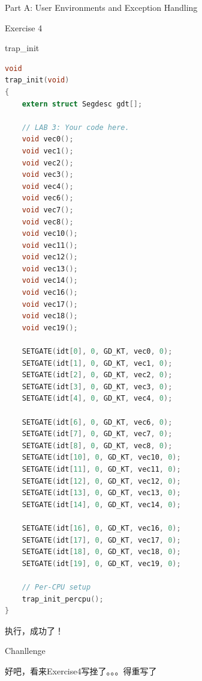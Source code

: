\documentclass[GBK,winfonts,a4paper,10pt]{ctexart}
\begin{document}
\begin{section}{ Part A: User Environments and Exception Handling }
\begin{subsection}{ Exercise 4 }
\begin{subsubsection}{ trap\_init }
\begin{lstlisting}[language=C]
void
trap_init(void)
{
	extern struct Segdesc gdt[];

	// LAB 3: Your code here.
	void vec0();
	void vec1();
	void vec2();
	void vec3();
	void vec4();
	void vec6();
	void vec7();
	void vec8();
	void vec10();
	void vec11();
	void vec12();
	void vec13();
	void vec14();
	void vec16();	
	void vec17();
	void vec18();
	void vec19();

	SETGATE(idt[0], 0, GD_KT, vec0, 0);
	SETGATE(idt[1], 0, GD_KT, vec1, 0);
	SETGATE(idt[2], 0, GD_KT, vec2, 0);
	SETGATE(idt[3], 0, GD_KT, vec3, 0);
	SETGATE(idt[4], 0, GD_KT, vec4, 0);

	SETGATE(idt[6], 0, GD_KT, vec6, 0);
	SETGATE(idt[7], 0, GD_KT, vec7, 0);
	SETGATE(idt[8], 0, GD_KT, vec8, 0);
	SETGATE(idt[10], 0, GD_KT, vec10, 0);
	SETGATE(idt[11], 0, GD_KT, vec11, 0);
	SETGATE(idt[12], 0, GD_KT, vec12, 0);
	SETGATE(idt[13], 0, GD_KT, vec13, 0);
	SETGATE(idt[14], 0, GD_KT, vec14, 0);

	SETGATE(idt[16], 0, GD_KT, vec16, 0);
	SETGATE(idt[17], 0, GD_KT, vec17, 0);
	SETGATE(idt[18], 0, GD_KT, vec18, 0);
	SETGATE(idt[19], 0, GD_KT, vec19, 0);

	// Per-CPU setup 
	trap_init_percpu();
}
\end{lstlisting}
执行，成功了！
\end{subsubsection}

\end{subsection}

\begin{subsection}{ Chanllenge }
\par
好吧，看来Exercise4写挫了。。。得重写了
\end{subsection}




\end{section}
\end{document}
